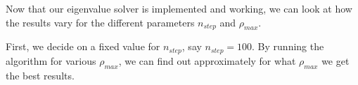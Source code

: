 Now that our eigenvalue solver is implemented and working, we can look at how
the results vary for the different parameters $n_{step}$ and  $\rho_{max}$.

First, we decide on a fixed value for $n_{step}$, say $ n_{step} = 100$. By
running the algorithm for various $\rho_{max}$, we can find out approximately
for what $\rho_{max}$ we get the best results. 

